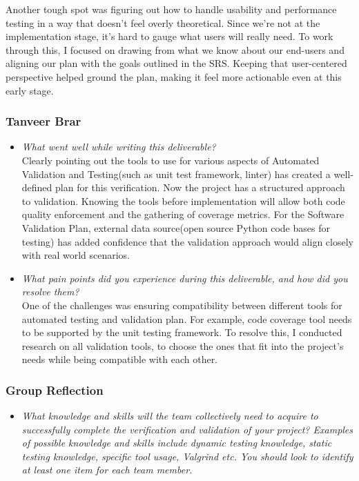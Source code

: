 \documentclass[12pt, titlepage]{article}
\begin{document}
\begin{appendices}
\begin{itemize}
  Another tough spot was figuring out how to handle usability and performance 
  testing in a way that doesn’t feel overly theoretical. Since we’re not at the 
  implementation stage, it’s hard to gauge what users will really need. To work 
  through this, I focused on drawing from what we know about our end-users and 
  aligning our plan with the goals outlined in the SRS. Keeping that user-centered 
  perspective helped ground the plan, making it feel more actionable even at this 
  early stage.
\end{itemize}

\subsubsection*{Tanveer Brar}
\begin{itemize}
    \item \textit{What went well while writing this deliverable?} \\

    Clearly pointing out the tools to use for various aspects of Automated Validation and Testing(such as unit test framework, linter) has created a well-defined plan for this verification. Now the project has a structured approach to validation. Knowing the tools before implementation will allow both code quality enforcement and the gathering of coverage metrics. For the Software Validation Plan, external data source(open source Python code bases for testing) has added confidence that the validation approach would align closely with real world scenarios.

    \item \textit{What pain points did you experience during this deliverable, and how did you resolve them?}\\

    One of the challenges was ensuring compatibility between different tools for automated testing and validation plan. For example, code coverage tool needs to be supported by the unit testing framework. To resolve this, I conducted research on all validation tools, to choose the ones that fit into the project's needs while being compatible with each other.

\end{itemize}

\subsubsection*{Group Reflection}
\begin{itemize}
  \item \textit{What knowledge and skills will the team collectively need to acquire to
  successfully complete the verification and validation of your project?
  Examples of possible knowledge and skills include dynamic testing knowledge,
  static testing knowledge, specific tool usage, Valgrind etc.  You should look to
  identify at least one item for each team member.\\} 
  

\end{itemize}
\end{appendices}
\end{document}
